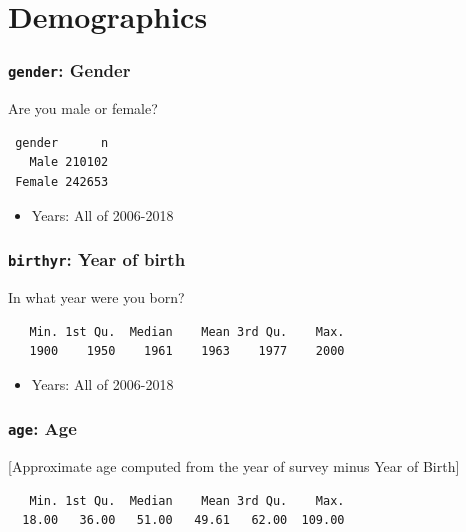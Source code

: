 \documentclass[10pt,article,oneside]{memoir}
\theoremstyle{definition}
\begin{document}
\hypertarget{demographics}{%
\section{Demographics}\label{demographics}}

\hypertarget{gender-gender}{%
\subsubsection{\texorpdfstring{\texttt{gender}:
Gender}{gender: Gender}}\label{gender-gender}}

Are you male or female?

\begin{verbatim}
 gender      n
   Male 210102
 Female 242653
\end{verbatim}

\begin{itemize}
\tightlist
\item
  Years: All of 2006-2018
\end{itemize}

\hypertarget{birthyr-year-of-birth}{%
\subsubsection{\texorpdfstring{\texttt{birthyr}: Year of
birth}{birthyr: Year of birth}}\label{birthyr-year-of-birth}}

In what year were you born?

\begin{verbatim}
   Min. 1st Qu.  Median    Mean 3rd Qu.    Max. 
   1900    1950    1961    1963    1977    2000 
\end{verbatim}

\begin{itemize}
\tightlist
\item
  Years: All of 2006-2018
\end{itemize}

\hypertarget{age-age}{%
\subsubsection{\texorpdfstring{\texttt{age}:
Age}{age: Age}}\label{age-age}}

{[}Approximate age computed from the year of survey minus Year of
Birth{]}

\begin{verbatim}
   Min. 1st Qu.  Median    Mean 3rd Qu.    Max. 
  18.00   36.00   51.00   49.61   62.00  109.00 
\end{verbatim}
\end{document}
